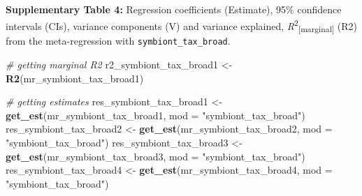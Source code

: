 \documentclass[
]{article}
\newenvironment{Shaded}{\begin{snugshade}}{\end{snugshade}}
\newcommand{\CommentTok}[1]{\textcolor[rgb]{0.56,0.35,0.01}{\textit{#1}}}
\newcommand{\DataTypeTok}[1]{\textcolor[rgb]{0.13,0.29,0.53}{#1}}
\newcommand{\KeywordTok}[1]{\textcolor[rgb]{0.13,0.29,0.53}{\textbf{#1}}}
\newcommand{\NormalTok}[1]{#1}
\newcommand{\StringTok}[1]{\textcolor[rgb]{0.31,0.60,0.02}{#1}}
\begin{document}
\textbf{Supplementary Table 4:} Regression coefficients (Estimate), 95\%
confidence intervals (CIs), variance components (V) and variance
explained, \emph{R}\textsuperscript{2}\textsubscript{{[}marginal{]}}
(R2) from the meta-regression with \texttt{symbiont\_tax\_broad}.

\begin{Shaded}
\begin{Highlighting}[]
\CommentTok{# getting marginal R2}
\NormalTok{r2_symbiont_tax_broad1 <-}\StringTok{ }\KeywordTok{R2}\NormalTok{(mr_symbiont_tax_broad1)}

\CommentTok{# getting estimates}
\NormalTok{res_symbiont_tax_broad1 <-}\StringTok{ }\KeywordTok{get_est}\NormalTok{(mr_symbiont_tax_broad1, }\DataTypeTok{mod =} \StringTok{"symbiont_tax_broad"}\NormalTok{)}
\NormalTok{res_symbiont_tax_broad2 <-}\StringTok{ }\KeywordTok{get_est}\NormalTok{(mr_symbiont_tax_broad2, }\DataTypeTok{mod =} \StringTok{"symbiont_tax_broad"}\NormalTok{)}
\NormalTok{res_symbiont_tax_broad3 <-}\StringTok{ }\KeywordTok{get_est}\NormalTok{(mr_symbiont_tax_broad3, }\DataTypeTok{mod =} \StringTok{"symbiont_tax_broad"}\NormalTok{)}
\NormalTok{res_symbiont_tax_broad4 <-}\StringTok{ }\KeywordTok{get_est}\NormalTok{(mr_symbiont_tax_broad4, }\DataTypeTok{mod =} \StringTok{"symbiont_tax_broad"}\NormalTok{)}


\end{Highlighting}
\end{Shaded}
\end{document}
